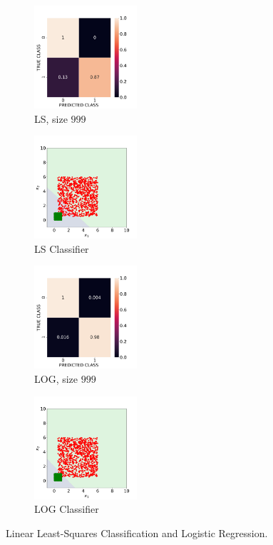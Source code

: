 \documentclass[12pt, a4 paper]{article}
\begin{document}
\begin{figure}[!htbp]
    \begin{subfigure}[!htbp]{0.2\textwidth}
       \centering
       \includegraphics[width=1.5in]{../results/ex1/acc_LS_dataset_Uniform_size_999.pdf}
       \caption{LS, size $999$}
       \label{fig:LS_P1a_999}
    \end{subfigure}
\quad
    \begin{subfigure}[!htbp]{0.2\textwidth}
       \centering
       \includegraphics[width=1.5in]{../results/ex1/samples_LS_dataset_Uniform_size_999.pdf}
       \caption{LS Classifier}
       \label{fig:LSD_P1a_999}
    \end{subfigure}
\quad
    \begin{subfigure}[!htbp]{0.2\textwidth}
       \centering
       \includegraphics[width=1.5in]{../results/ex1/acc_LOG_dataset_Uniform_size_999.pdf}
       \caption{LOG, size $999$}
       \label{fig:LOG_P1a_999}
    \end{subfigure}
\quad
    \begin{subfigure}[!htbp]{0.2\textwidth}
       \centering
       \includegraphics[width=1.5in]{../results/ex1/samples_LOG_dataset_Uniform_size_999.pdf}
       \caption{LOG Classifier}
       \label{fig:LOGD_P1a_999}
    \end{subfigure}     

\caption{Linear Least-Squares Classification and Logistic Regression.}
\label{fig:ex1_P1a}
\end{figure}
\end{document}
